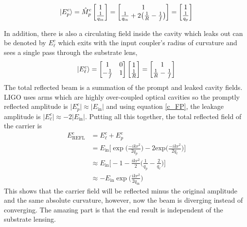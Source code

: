 		\begin{equation}\label{eq:promptE}
		 \ket{E^{c}_{p}}=
		 \hat{M}^{c}_{p}
		 \begin{bmatrix}
		 					1  
		 \\ 	\frac{1}{q_{\text{in}}}
		 \end{bmatrix}
		 =
		 \begin{bmatrix}
		 1  
		 \\ 	\frac{1}{q_{\text{in}}} + 2 \big(\frac{1}{R} - \frac{1}{f}\big)
		 \end{bmatrix}
		 =
		 \begin{bmatrix}
		 1  
		 \\ 	\frac{1}{q_{\text{p}}}
		 \end{bmatrix}
		\end{equation}
		
		In addition, there is also a circulating field inside the cavity which leaks out can be denoted by $E^c_{\ell}$ which exits with the input coupler's radius of curvature and sees a single pass through the substrate lens,
		\begin{equation}\label{eq:leakE}
		\ket{E^c_{\ell}} = 		 
		\begin{bmatrix}
		1 	&	0 
		\\ 	-\frac{1}{f} 	&	1
		\end{bmatrix}
		\begin{bmatrix}
		1  
		\\ 	\frac{1}{R}
		\end{bmatrix}
		=
		\begin{bmatrix}
		1  
		\\ 	\frac{1}{R} - \frac{1}{f}
		\end{bmatrix}
		\end{equation}
		The total reflected beam is a summation of the prompt and leaked cavity fields.  LIGO uses arms which are highly over-coupled optical cavities so the promptly reflected amplitude is $\vert E^c_p \vert \approx \vert E_{\text{in}} \vert$ and using equation \ref{c_FP}, the leakage amplitude is $\vert E^c_\ell \vert \approx -2\vert E_{\text{in}} \vert$.  Putting all this together, the total reflected field of the carrier is
		\begin{equation}
		\begin{aligned}
		E^c_{\text{REFL}} 	&= E^c_{\ell} + E^c_p \\
							&= E_{\text{in}} \bigg[ \exp \bigg(\frac{-ik r^2}{2q_p}\bigg) - 2  \text{exp} \bigg(\frac{-ik r^2}{2q_{\ell}}\bigg) \bigg]\\
							&\approx E_{\text{in}} \bigg[ -1 - \frac{ikr^2}{2} \bigg( \frac{1}{q_p} - \frac{2}{q_\ell} \bigg) \bigg]\\
							&\approx -E_{\text{in}} \exp\bigg(\frac{ikr^2}{2q_{\text{in}}}\bigg) 
		\end{aligned} 
		\end{equation}
		This shows that the carrier field will be reflected minus the original amplitude and the same absolute curvature, however, now the beam is diverging instead of converging.  The amazing part is that the end result is independent of the substrate lensing.
		
